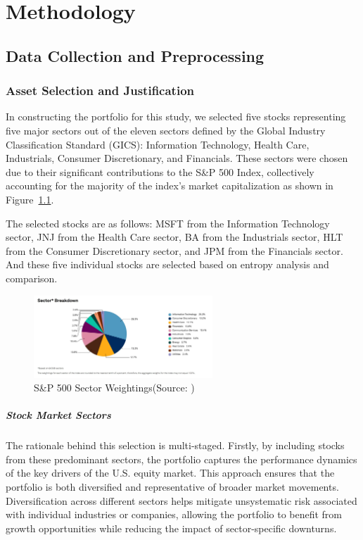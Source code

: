 
\chapter{Methodology}\label{chapter:methodology}

\section{Data Collection and Preprocessing}

\subsection{Asset Selection and Justification}


In constructing the portfolio for this study, we selected five stocks representing five major sectors out of the eleven sectors defined by the Global Industry Classification Standard (GICS): Information Technology, Health Care, Industrials, Consumer Discretionary, and Financials. These sectors were chosen due to their significant contributions to the S\&P 500 Index, collectively accounting for the majority of the index's market capitalization as shown in Figure~\ref{fig:sector_sp}.

The selected stocks are as follows: \ac{MSFT} from the Information Technology sector, \ac{JNJ} from the Health Care sector, \ac{BA} from the Industrials sector, \ac{HLT} from the Consumer Discretionary sector, and \ac{JPM} from the Financials sector. And these five individual stocks are selected based on entropy analysis and comparison.

\begin{figure}[htbp]
    \centering
    \includegraphics[width=0.6\textwidth]{figures/sector_SP.png}
    \caption{S\&P 500 Sector Weightings(Source: \cite{S&P500SectorWeights}) }
    \label{fig:sector_sp}
\end{figure}

\paragraph{Stock Market Sectors}
The rationale behind this selection is multi-staged. Firstly, by including stocks from these predominant sectors, the portfolio captures the performance dynamics of the key drivers of the U.S. equity market. This approach ensures that the portfolio is both diversified and representative of broader market movements. Diversification across different sectors helps mitigate unsystematic risk associated with individual industries or companies, allowing the portfolio to benefit from growth opportunities while reducing the impact of sector-specific downturns.

